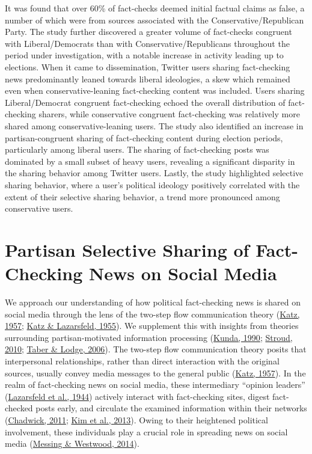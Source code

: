 \documentclass[
  12pt,
]{article}
\begin{document}
It was found that over 60\% of fact-checks deemed initial factual claims
as false, a number of which were from sources associated with the
Conservative/Republican Party. The study further discovered a greater
volume of fact-checks congruent with Liberal/Democrats than with
Conservative/Republicans throughout the period under investigation, with
a notable increase in activity leading up to elections. When it came to
dissemination, Twitter users sharing fact-checking news predominantly
leaned towards liberal ideologies, a skew which remained even when
conservative-leaning fact-checking content was included. Users sharing
Liberal/Democrat congruent fact-checking echoed the overall distribution
of fact-checking sharers, while conservative congruent fact-checking was
relatively more shared among conservative-leaning users. The study also
identified an increase in partisan-congruent sharing of fact-checking
content during election periods, particularly among liberal users. The
sharing of fact-checking posts was dominated by a small subset of heavy
users, revealing a significant disparity in the sharing behavior among
Twitter users. Lastly, the study highlighted selective sharing behavior,
where a user's political ideology positively correlated with the extent
of their selective sharing behavior, a trend more pronounced among
conservative users.

\hypertarget{partisan-selective-sharing-of-fact-checking-news-on-social-media}{%
\section{Partisan Selective Sharing of Fact-Checking News on Social
Media}\label{partisan-selective-sharing-of-fact-checking-news-on-social-media}}

We approach our understanding of how political fact-checking news is
shared on social media through the lens of the two-step flow
communication theory (\protect\hyperlink{ref-katz1957two}{Katz, 1957};
\protect\hyperlink{ref-katz1955personal}{Katz \& Lazarsfeld, 1955}). We
supplement this with insights from theories surrounding
partisan-motivated information processing
(\protect\hyperlink{ref-kunda1990case}{Kunda, 1990};
\protect\hyperlink{ref-stroud2010polarization}{Stroud, 2010};
\protect\hyperlink{ref-taber2006motivated}{Taber \& Lodge, 2006}). The
two-step flow communication theory posits that interpersonal
relationships, rather than direct interaction with the original sources,
usually convey media messages to the general public
(\protect\hyperlink{ref-katz1957two}{Katz, 1957}). In the realm of
fact-checking news on social media, these intermediary ``opinion
leaders'' (\protect\hyperlink{ref-lazarsfeld1944people}{Lazarsfeld et
al., 1944}) actively interact with fact-checking sites, digest
fact-checked posts early, and circulate the examined information within
their networks (\protect\hyperlink{ref-chadwick2011political}{Chadwick,
2011}; \protect\hyperlink{ref-kim2013stumbling}{Kim et al., 2013}).
Owing to their heightened political involvement, these individuals play
a crucial role in spreading news on social media
(\protect\hyperlink{ref-messing2014selective}{Messing \& Westwood,
2014}).
\end{document}
